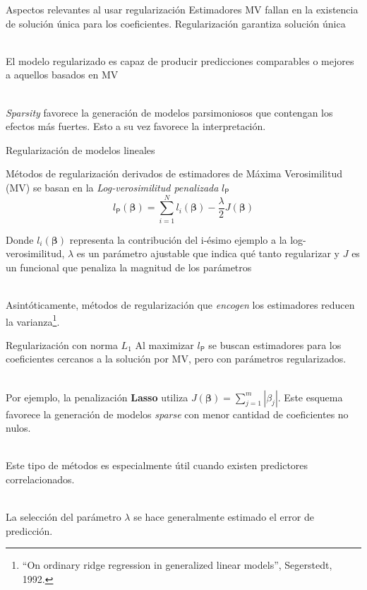 \documentclass[]{beamer}
\begin{document}
\begin{frame}{Aspectos relevantes al usar regularización}
	Estimadores MV fallan en la existencia de solución única para los coeficientes. Regularización garantiza 
	solución única\\~\ 
	
	El modelo regularizado es capaz de producir predicciones comparables o mejores a aquellos basados en MV\\~\
	
	\textit{Sparsity} favorece la generación de modelos parsimoniosos que contengan los efectos más fuertes.  Esto a su vez favorece
	la interpretación.
\end{frame}

\begin{frame}{Regularización de modelos lineales }

	Métodos de regularización derivados de estimadores de Máxima Verosimilitud (MV) se basan en
	la \textit{Log-verosimilitud penalizada} $l_{\mathsf{P}}$
	$$l_{\mathsf{P}}(\pmb{\beta})=\displaystyle\sum_{i=1}^{N}l_i(\pmb{\beta})-\frac{\lambda}{2}J(\pmb{\beta})$$

	Donde $l_i(\pmb{\beta})$ representa la contribución del i-ésimo ejemplo a la log-verosimilitud, $\lambda$ 
	es un parámetro ajustable que indica qué tanto regularizar y $J$ es un funcional que penaliza la magnitud de los parámetros\\~\ 
	
	Asintóticamente, métodos de regularización que \textit{encogen} los estimadores reducen la varianza\footnote{\tiny{``On ordinary ridge regression in generalized linear models'', Segerstedt, 1992.}}.
	
\end{frame}

\begin{frame}{Regularización con norma $L_1$ }
	Al maximizar $l_{\mathsf{P}}$ se buscan estimadores para los coeficientes cercanos a la solución por MV, 
	pero con parámetros regularizados. \\~\  

	Por ejemplo, la penalización \textbf{Lasso} utiliza $J(\pmb{\beta})=\sum_{j=1}^m |\beta_j|$. Este esquema 
	favorece la generación de modelos \textit{sparse} con menor cantidad de coeficientes no nulos.\\~\
	
	Este tipo de métodos es especialmente útil cuando existen predictores correlacionados.\\~\
	
	La  selección del parámetro $\lambda$ se hace generalmente estimado el error de predicción.

\end{frame}
\end{document}
